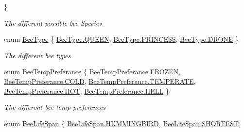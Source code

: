 \begin{DoxyCompactItemize}
 \}\begin{DoxyCompactList}\small\item\em The different possible bee Species \end{DoxyCompactList}
\item 
enum \hyperlink{namespace_bee_game_1_1_enums_a9376a1582db99d20c756e24de728944f}{Bee\+Type} \{ \hyperlink{namespace_bee_game_1_1_enums_a9376a1582db99d20c756e24de728944fa02d144e18eda99bcb94f3a764756805e}{Bee\+Type.\+Q\+U\+E\+EN}, 
\hyperlink{namespace_bee_game_1_1_enums_a9376a1582db99d20c756e24de728944fa3ca9340682c7fce45dcf786fc8232e0c}{Bee\+Type.\+P\+R\+I\+N\+C\+E\+SS}, 
\hyperlink{namespace_bee_game_1_1_enums_a9376a1582db99d20c756e24de728944fad3c26749c501de5924ed7ad5f621de4e}{Bee\+Type.\+D\+R\+O\+NE}
 \}\begin{DoxyCompactList}\small\item\em The different bee types \end{DoxyCompactList}
\item 
enum \hyperlink{namespace_bee_game_1_1_enums_a9db0f9ac859fab168654d657f248b024}{Bee\+Temp\+Preferance} \{ \newline
\hyperlink{namespace_bee_game_1_1_enums_a9db0f9ac859fab168654d657f248b024a081912e034fd835fdda076251f2cd586}{Bee\+Temp\+Preferance.\+F\+R\+O\+Z\+EN}, 
\hyperlink{namespace_bee_game_1_1_enums_a9db0f9ac859fab168654d657f248b024a3f7ff4daa99912d1b0c8c64340edb9fb}{Bee\+Temp\+Preferance.\+C\+O\+LD}, 
\hyperlink{namespace_bee_game_1_1_enums_a9db0f9ac859fab168654d657f248b024ad5938597ebb26919bd3b131a5f076b35}{Bee\+Temp\+Preferance.\+T\+E\+M\+P\+E\+R\+A\+TE}, 
\hyperlink{namespace_bee_game_1_1_enums_a9db0f9ac859fab168654d657f248b024ac429fde8b1b986d42f84ba63dbfef6ac}{Bee\+Temp\+Preferance.\+H\+OT}, 
\newline
\hyperlink{namespace_bee_game_1_1_enums_a9db0f9ac859fab168654d657f248b024a5fa58915fea0b7f3e0f1e8ec558a9123}{Bee\+Temp\+Preferance.\+H\+E\+LL}
 \}\begin{DoxyCompactList}\small\item\em The different bee temp preferences \end{DoxyCompactList}
\item 
enum \hyperlink{namespace_bee_game_1_1_enums_ae3853807ded2f4d99a0d4a7fb4b2bc46}{Bee\+Life\+Span} \{ \newline
\hyperlink{namespace_bee_game_1_1_enums_ae3853807ded2f4d99a0d4a7fb4b2bc46a2acefbb6f248411a587d402bfa3f17d2}{Bee\+Life\+Span.\+H\+U\+M\+M\+I\+N\+G\+B\+I\+RD}, 
\hyperlink{namespace_bee_game_1_1_enums_ae3853807ded2f4d99a0d4a7fb4b2bc46aa63ddb11bc6cc95583b3f7632a45a16b}{Bee\+Life\+Span.\+S\+H\+O\+R\+T\+E\+ST}, 

\end{DoxyCompactItemize}
